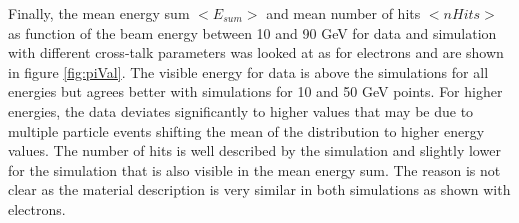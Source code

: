 Finally, the mean energy sum $<E_{sum}>$ and mean number of hits $<nHits>$ as function of the beam energy between 10 and 90 GeV for data and simulation with different cross-talk parameters was looked at as for electrons and are shown in figure \ref{fig:piVal}. The visible energy for data is above the simulations for all energies but agrees better with simulations for 10 and 50 GeV points. For higher energies, the data deviates significantly to higher values that may be due to multiple particle events shifting the mean of the distribution to higher energy values. The number of hits is well described by the \mokka simulation and slightly lower for the \ddhep simulation that is also visible in the mean energy sum. The reason is not clear as the material description is very similar in both simulations as shown with electrons.

